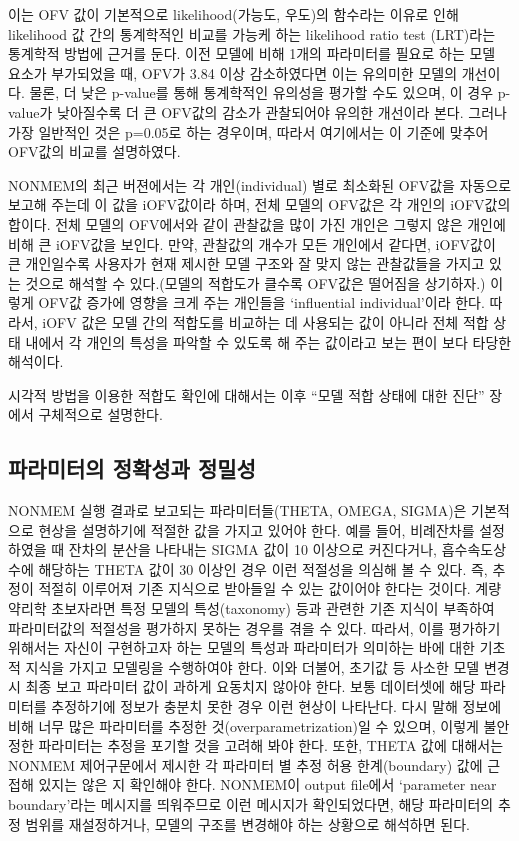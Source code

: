 \documentclass[
  10pt,
]{krantz}
\begin{document}
이는 OFV 값이 기본적으로 likelihood(가능도, 우도)의 함수라는 이유로 인해 likelihood 값 간의 통계학적인
비교를 가능케 하는 likelihood ratio test (LRT)라는 통계학적 방법에 근거를 둔다. 이전 모델에 비해
1개의 파라미터를 필요로 하는 모델 요소가 부가되었을 때, OFV가 3.84 이상 감소하였다면 이는 유의미한 모델의 개선이다.
물론, 더 낮은 p-value를 통해 통계학적인 유의성을 평가할 수도 있으며, 이 경우 p-value가 낮아질수록 더 큰
OFV값의 감소가 관찰되어야 유의한 개선이라 본다. 그러나 가장 일반적인 것은 p=0.05로 하는 경우이며, 따라서 여기에서는 이
기준에 맞추어 OFV값의 비교를 설명하였다.

NONMEM의 최근 버젼에서는 각 개인(individual) 별로 최소화된 OFV값을 자동으로 보고해 주는데 이 값을
iOFV값이라 하며, 전체 모델의 OFV값은 각 개인의 iOFV값의 합이다. 전체 모델의 OFV에서와 같이 관찰값을
많이 가진 개인은 그렇지 않은 개인에 비해 큰 iOFV값을 보인다. 만약, 관찰값의 개수가 모든 개인에서 같다면,
iOFV값이 큰 개인일수록 사용자가 현재 제시한 모델 구조와 잘 맞지 않는 관찰값들을 가지고 있는 것으로 해석할 수
있다.(모델의 적합도가 클수록 OFV값은 떨어짐을 상기하자.) 이렇게 OFV값 증가에 영향을 크게 주는 개인들을
`influential individual'이라 한다. 따라서, iOFV 값은 모델 간의 적합도를 비교하는 데 사용되는 값이
아니라 전체 적합 상태 내에서 각 개인의 특성을 파악할 수 있도록 해 주는 값이라고 보는 편이 보다 타당한 해석이다.

시각적 방법을 이용한 적합도 확인에 대해서는 이후 ``모델 적합 상태에 대한 진단'' 장에서 구체적으로 설명한다.

\hypertarget{uxd30cuxb77cuxbbf8uxd130uxc758-uxc815uxd655uxc131uxacfc-uxc815uxbc00uxc131}{%
\subsection{파라미터의 정확성과 정밀성}\label{uxd30cuxb77cuxbbf8uxd130uxc758-uxc815uxd655uxc131uxacfc-uxc815uxbc00uxc131}}

NONMEM 실행 결과로 보고되는 파라미터들(THETA, OMEGA, SIGMA)은 기본적으로 현상을 설명하기에 적절한 값을
가지고 있어야 한다. 예를 들어, 비례잔차를 설정하였을 때 잔차의 분산을 나타내는 SIGMA 값이 10 이상으로
커진다거나, 흡수속도상수에 해당하는 THETA 값이 30 이상인 경우 이런 적절성을 의심해 볼 수 있다. 즉,
추정이 적절히 이루어져 기존 지식으로 받아들일 수 있는 값이어야 한다는 것이다. 계량약리학 초보자라면 특정 모델의
특성(taxonomy) 등과 관련한 기존 지식이 부족하여 파라미터값의 적절성을 평가하지 못하는 경우를 겪을 수 있다.
따라서, 이를 평가하기 위해서는 자신이 구현하고자 하는 모델의 특성과 파라미터가 의미하는 바에 대한 기초적 지식을
가지고 모델링을 수행하여야 한다. 이와 더불어, 초기값 등 사소한 모델 변경 시 최종 보고 파라미터 값이 과하게
요동치지 않아야 한다. 보통 데이터셋에 해당 파라미터를 추정하기에 정보가 충분치 못한 경우 이런 현상이 나타난다.
다시 말해 정보에 비해 너무 많은 파라미터를 추정한 것(overparametrization)일 수 있으며, 이렇게 불안정한
파라미터는 추정을 포기할 것을 고려해 봐야 한다. 또한, THETA 값에 대해서는 NONMEM 제어구문에서 제시한 각
파라미터 별 추정 허용 한계(boundary) 값에 근접해 있지는 않은 지 확인해야 한다. NONMEM이 output
file에서 `parameter near boundary'라는 메시지를 띄워주므로 이런 메시지가 확인되었다면, 해당 파라미터의
추정 범위를 재설정하거나, 모델의 구조를 변경해야 하는 상황으로 해석하면 된다.
\end{document}
